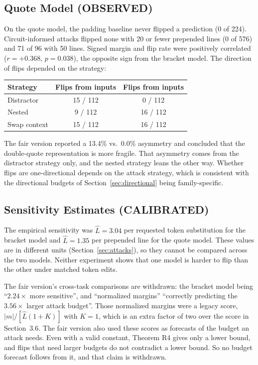 \documentclass[11pt]{article}
\newcommand{\lab}[1]{{\footnotesize\MakeUppercase{#1}}}
\newcommand{\calibrated}{\lab{calibrated}}
\newcommand{\observed}{\lab{observed}}
\newcommand{\dq}{\texttt{\textquotedbl}}
\newcommand{\sq}{\texttt{\textquotesingle}}
\newcommand{\Lhat}{\hat{L}}
\begin{document}
\subsection{Quote Model (\observed)}\label{sec:quote}
On the quote model, the padding baseline never flipped a prediction (0 of 224). Circuit-informed attacks flipped none with 20 or fewer prepended lines (0 of 576) and 71 of 96 with 50 lines. Signed margin and flip rate were positively correlated ($r = +0.368$, $p = 0.038$), the opposite sign from the bracket model. The direction of flips depended on the strategy:
\begin{center}
\small
\begin{tabular}{@{}lcc@{}}
\toprule
Strategy & Flips from \dq{} inputs & Flips from \sq{} inputs \\
\midrule
Distractor & 15 / 112 & 0 / 112 \\
Nested & 9 / 112 & 16 / 112 \\
Swap context & 15 / 112 & 16 / 112 \\
\bottomrule
\end{tabular}
\end{center}
The fair version reported a 13.4\% vs.\ 0.0\% asymmetry and concluded that the double-quote representation is more fragile. That asymmetry comes from the distractor strategy only, and the nested strategy leans the other way. Whether flips are one-directional depends on the attack strategy, which is consistent with the directional budgets of Section~\ref{sec:directional} being family-specific.

\subsection{Sensitivity Estimates (\calibrated)}\label{sec:normalized}
The empirical sensitivity was $\Lhat = 3.04$ per requested token substitution for the bracket model and $\Lhat = 1.35$ per prepended line for the quote model. These values are in different units (Section~\ref{sec:attacks}), so they cannot be compared across the two models. Neither experiment shows that one model is harder to flip than the other under matched token edits.

The fair version's cross-task comparisons are withdrawn: the bracket model being ``$2.24\times$ more sensitive'', and ``normalized margins'' ``correctly predicting the $3.56\times$ larger attack budget''. Those normalized margins were a legacy score, $|m|/[\Lhat(1+K)]$ with $K = 1$, which is an extra factor of two over the score in Section~3.6. The fair version also used these scores as forecasts of the budget an attack needs. Even with a valid constant, Theorem R4 gives only a lower bound, and flips that need larger budgets do not contradict a lower bound. So no budget forecast follows from it, and that claim is withdrawn.
\end{document}
